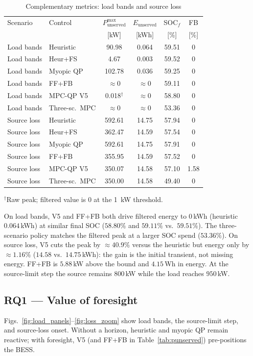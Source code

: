 \documentclass{ieeeaccess}
\begin{document}
\begin{table}[!t]
\centering
\caption{Complementary metrics: load bands and source loss}
\label{tab:metrics}
\begin{tabular}{@{}llcccc@{}}
\toprule
Scenario & Control & $P_{\mathrm{unserved}}^{\max}$ & $E_{\mathrm{unserved}}$ & SOC$_f$ & FB \\
 &  & [kW] & [kWh] & [\%] & [\%] \\
\midrule
Load bands & Heuristic & 90.98 & 0.064 & 59.51 & 0 \\
Load bands & Heur+FS & 4.67 & 0.003 & 59.52 & 0 \\
Load bands & Myopic QP & 102.78 & 0.036 & 59.25 & 0 \\
Load bands & FF+FB & $\approx 0$ & $\approx 0$ & 59.11 & 0 \\
Load bands & MPC-QP V5 & 0.018$^{\dagger}$ & $\approx 0$ & 58.80 & 0 \\
Load bands & Three-sc.\ MPC & $\approx 0$ & $\approx 0$ & 53.36 & 0 \\
Source loss & Heuristic & 592.61 & 14.75 & 57.94 & 0 \\
Source loss & Heur+FS & 362.47 & 14.59 & 57.54 & 0 \\
Source loss & Myopic QP & 592.61 & 14.75 & 57.91 & 0 \\
Source loss & FF+FB & 355.95 & 14.59 & 57.52 & 0 \\
Source loss & MPC-QP V5 & 350.07 & 14.58 & 57.10 & 1.58 \\
Source loss & Three-sc.\ MPC & 350.00 & 14.58 & 49.40 & 0 \\
\bottomrule
\end{tabular}
\end{table}
{\scriptsize $^{\dagger}$Raw peak; filtered value is 0 at the \SI{1}{\kilo\watt} threshold.}

On load bands, V5 and FF+FB both drive filtered energy to $0$\,kWh (heuristic $0.064$\,kWh) at similar final SOC ($58.80\%$ and $59.11\%$ vs.\ $59.51\%$). The three-scenario policy matches the filtered peak at a larger SOC spend ($53.36\%$). On source loss, V5 cuts the peak by $\approx 40.9\%$ versus the heuristic but energy only by $\approx 1.16\%$ ($14.58$ vs.\ $14.75$\,kWh): the gain is the initial transient, not missing energy. FF+FB is $5.88$\,kW above the bound and $4.15$\,Wh in energy. At the source-limit step the source remains $800$\,kW while the load reaches $950$\,kW.

\subsection{RQ1 --- Value of foresight}
Figs.~\ref{fig:load_panels}--\ref{fig:loss_zoom} show load bands, the source-limit step, and source-loss onset. Without a horizon, heuristic and myopic QP remain reactive; with foresight, V5 (and FF+FB in Table~\ref{tab:punserved}) pre-positions the BESS.
\end{document}
